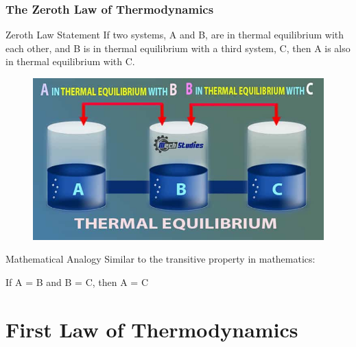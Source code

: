 \documentclass{beamer}
\begin{document}
\begin{frame}
    \frametitle{The Zeroth Law of Thermodynamics}
    \begin{block}{Zeroth Law Statement}
        If two systems, A and B, are in thermal equilibrium with each other, and B is in thermal equilibrium with a third system, C, then A is also in thermal equilibrium with C.
    \end{block}
    
    \begin{center}
        \begin{figure}
            \centering
            \includegraphics[width=0.5\linewidth]{thermal-equilibrium-basics-1018696211.jpg}
        \end{figure}
    \end{center}
    
    \begin{exampleblock}{Mathematical Analogy}
        Similar to the transitive property in mathematics:
        
        If A = B and B = C, then A = C
    \end{exampleblock}
\end{frame}

\section{First Law of Thermodynamics}
\end{document}
